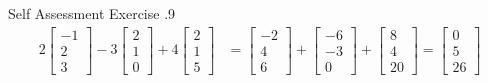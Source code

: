 \documentclass[\main/notes.tex]{subfiles}
\begin{document}
				\begin{exercise}{Self Assessment Exercise \thechapter.9}
					\begin{align*}
						2\begin{bmatrix}
							-1 \\ 2 \\ 3
						\end{bmatrix} - 3 \begin{bmatrix}
							2 \\ 1 \\ 0
						\end{bmatrix} + 4 \begin{bmatrix}
							2 \\ 1 \\ 5
						\end{bmatrix} &= \begin{bmatrix}
							-2 \\ 4 \\ 6
						\end{bmatrix} + \begin{bmatrix}
							-6 \\ -3 \\ 0
						\end{bmatrix} + \begin{bmatrix}
							8 \\ 4 \\ 20
						\end{bmatrix} = \begin{bmatrix}
							0 \\ 5 \\ 26
						\end{bmatrix}
					\end{align*}
				\end{exercise}
			\pagebreak
\end{document}
